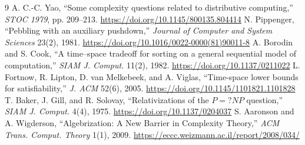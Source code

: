 \documentclass[11pt]{article}
\begin{document}
\begin{thebibliography}{9}
A. C.-C. Yao, ``Some complexity questions related to distributive
computing,'' \emph{STOC 1979}, pp. 209--213.
\url{https://doi.org/10.1145/800135.804414}
N. Pippenger, ``Pebbling with an auxiliary pushdown,''
\emph{Journal of Computer and System Sciences} 23(2), 1981.
\url{https://doi.org/10.1016/0022-0000(81)90011-8}
A. Borodin and S. Cook, ``A time--space tradeoff for sorting on a general
sequential model of computation,'' \emph{SIAM J. Comput.} 11(2), 1982.
\url{https://doi.org/10.1137/0211022}
L. Fortnow, R. Lipton, D. van Melkebeek, and A. Viglas,
``Time-space lower bounds for satisfiability,'' \emph{J. ACM} 52(6), 2005.
\url{https://doi.org/10.1145/1101821.1101828}
T. Baker, J. Gill, and R. Solovay, ``Relativizations of the $P=?NP$
question,'' \emph{SIAM J. Comput.} 4(4), 1975.
\url{https://doi.org/10.1137/0204037}
S. Aaronson and A. Wigderson, ``Algebrization: A New Barrier in Complexity
Theory,'' \emph{ACM Trans. Comput. Theory} 1(1), 2009.
\url{https://eccc.weizmann.ac.il/report/2008/034/}
\end{thebibliography}

\end{document}
